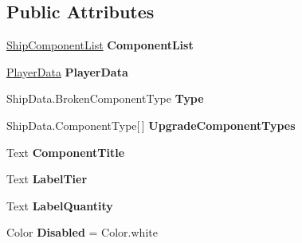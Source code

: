\subsection*{Public Attributes}
\begin{DoxyCompactItemize}
\item 
\hypertarget{class_skyrates_1_1_u_i_1_1_upgrade_button_a2acd0e22c625bcfccf105b812dc69487}{\hyperlink{class_skyrates_1_1_ship_1_1_ship_component_list}{Ship\-Component\-List} {\bfseries Component\-List}}\label{class_skyrates_1_1_u_i_1_1_upgrade_button_a2acd0e22c625bcfccf105b812dc69487}

\item 
\hypertarget{class_skyrates_1_1_u_i_1_1_upgrade_button_a8274805ed000b033f1a6305e640dc43b}{\hyperlink{class_skyrates_1_1_data_1_1_player_data}{Player\-Data} {\bfseries Player\-Data}}\label{class_skyrates_1_1_u_i_1_1_upgrade_button_a8274805ed000b033f1a6305e640dc43b}

\item 
\hypertarget{class_skyrates_1_1_u_i_1_1_upgrade_button_a675ef8bc95430f899377ce1ef2d6a4bd}{Ship\-Data.\-Broken\-Component\-Type {\bfseries Type}}\label{class_skyrates_1_1_u_i_1_1_upgrade_button_a675ef8bc95430f899377ce1ef2d6a4bd}

\item 
\hypertarget{class_skyrates_1_1_u_i_1_1_upgrade_button_ad1c610ca07eb77fc9cb43aca053478cb}{Ship\-Data.\-Component\-Type\mbox{[}$\,$\mbox{]} {\bfseries Upgrade\-Component\-Types}}\label{class_skyrates_1_1_u_i_1_1_upgrade_button_ad1c610ca07eb77fc9cb43aca053478cb}

\item 
\hypertarget{class_skyrates_1_1_u_i_1_1_upgrade_button_ad2916f3bacb4ec1206d9bbb545a679b6}{Text {\bfseries Component\-Title}}\label{class_skyrates_1_1_u_i_1_1_upgrade_button_ad2916f3bacb4ec1206d9bbb545a679b6}

\item 
\hypertarget{class_skyrates_1_1_u_i_1_1_upgrade_button_aaa0635abf74dcec5fe3eaf5a2bc9cc96}{Text {\bfseries Label\-Tier}}\label{class_skyrates_1_1_u_i_1_1_upgrade_button_aaa0635abf74dcec5fe3eaf5a2bc9cc96}

\item 
\hypertarget{class_skyrates_1_1_u_i_1_1_upgrade_button_a7dad4be37db0299d551a6f9daf2023e7}{Text {\bfseries Label\-Quantity}}\label{class_skyrates_1_1_u_i_1_1_upgrade_button_a7dad4be37db0299d551a6f9daf2023e7}

\item 
\hypertarget{class_skyrates_1_1_u_i_1_1_upgrade_button_acc6e9567925d0f5c1ce3b1ddbbcf3979}{Color {\bfseries Disabled} = Color.\-white}\label{class_skyrates_1_1_u_i_1_1_upgrade_button_acc6e9567925d0f5c1ce3b1ddbbcf3979}


\end{DoxyCompactItemize}
